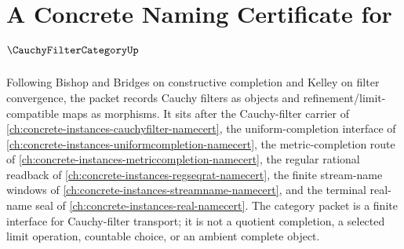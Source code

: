 \chapter{A Concrete Naming Certificate for $\CauchyFilterCategoryUp$}
\label{ch:concrete-instances-cauchy-filter-category-namecert}

Following Bishop and Bridges on constructive completion and Kelley on filter convergence, the packet records Cauchy filters as objects and refinement/limit-compatible maps as morphisms. It sits after the Cauchy-filter carrier of \autoref{ch:concrete-instances-cauchyfilter-namecert}, the uniform-completion interface of \autoref{ch:concrete-instances-uniformcompletion-namecert}, the metric-completion route of \autoref{ch:concrete-instances-metriccompletion-namecert}, the regular rational readback of \autoref{ch:concrete-instances-regseqrat-namecert}, the finite stream-name windows of \autoref{ch:concrete-instances-streamname-namecert}, and the terminal real-name seal of \autoref{ch:concrete-instances-real-namecert}. The category packet is a finite interface for Cauchy-filter transport; it is not a quotient completion, a selected limit operation, countable choice, or an ambient complete object.

